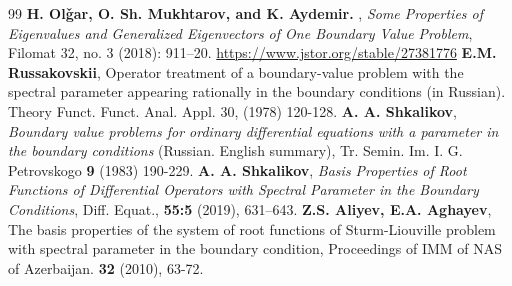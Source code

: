 \documentclass[10pt,a4paper]{amsart}
\numberwithin{equation}{section}
\begin{document}
\begin{thebibliography}{99}
 \textbf{H. Olǧar, O. Sh. Mukhtarov, and K. Aydemir. }, \textit{Some Properties of Eigenvalues and Generalized Eigenvectors of One Boundary Value Problem}, Filomat 32, no. 3 (2018): 911–20. \url{https://www.jstor.org/stable/27381776}
 \textbf{E.M. Russakovskii}, Operator treatment of a boundary-value problem with the spectral parameter appearing rationally in the boundary conditions (in Russian). Theory Funct. Funct. Anal. Appl. 30, (1978) 120-128.
 \textbf{A. A. Shkalikov}, \textit{Boundary value problems for ordinary differential equations with a parameter in the boundary conditions} (Russian. English summary), Tr. Semin. Im. I. G. Petrovskogo \textbf{9} (1983) 190-229.
 \textbf{A. A. Shkalikov}, \textit{Basis Properties of Root Functions of Differential Operators with Spectral Parameter in the Boundary Conditions}, Diff. Equat., \textbf{55:5} (2019), 631–643.
 \textbf{Z.S. Aliyev, E.A. Aghayev}, The basis properties of the system of root functions of Sturm-Liouville problem with spectral parameter in the boundary condition, Proceedings of IMM of NAS of Azerbaijan. \textbf{32} (2010), 63-72.
\end{thebibliography}
\end{document}
